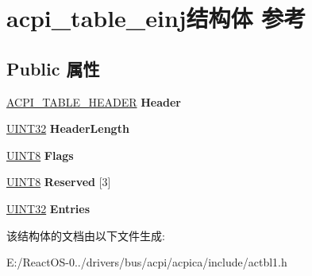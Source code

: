 \hypertarget{structacpi__table__einj}{}\section{acpi\+\_\+table\+\_\+einj结构体 参考}
\label{structacpi__table__einj}
\subsection*{Public 属性}
\begin{DoxyCompactItemize}
\item 
\mbox{\label{structacpi__table__einj_ae079234a117a4787570c9e476892ad58}} 
\hyperlink{structacpi__table__header}{A\+C\+P\+I\+\_\+\+T\+A\+B\+L\+E\+\_\+\+H\+E\+A\+D\+ER} {\bfseries Header}
\item 
\mbox{\label{structacpi__table__einj_a579820379e092abb69837954fc61c71f}} 
\hyperlink{_processor_bind_8h_ae1e6edbbc26d6fbc71a90190d0266018}{U\+I\+N\+T32} {\bfseries Header\+Length}
\item 
\mbox{\label{structacpi__table__einj_ab767c90e327d87b57f36741bfaeabd3a}} 
\hyperlink{_processor_bind_8h_ab27e9918b538ce9d8ca692479b375b6a}{U\+I\+N\+T8} {\bfseries Flags}
\item 
\mbox{\label{structacpi__table__einj_a289e5864d68208f1eb3445be732282e1}} 
\hyperlink{_processor_bind_8h_ab27e9918b538ce9d8ca692479b375b6a}{U\+I\+N\+T8} {\bfseries Reserved} \mbox{[}3\mbox{]}
\item 
\mbox{\label{structacpi__table__einj_aa21fc85089fadf9529f7815314f0b9d0}} 
\hyperlink{_processor_bind_8h_ae1e6edbbc26d6fbc71a90190d0266018}{U\+I\+N\+T32} {\bfseries Entries}
\end{DoxyCompactItemize}


该结构体的文档由以下文件生成\+:\begin{DoxyCompactItemize}
\item 
E\+:/\+React\+O\+S-\/0../drivers/bus/acpi/acpica/include/actbl1.\+h\end{DoxyCompactItemize}

